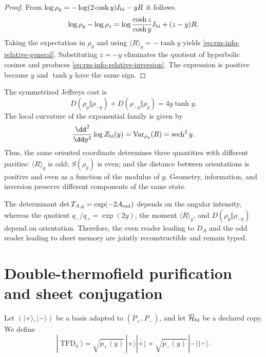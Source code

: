 \begin{proof}
From \(\log\rho_y=-\log(2\cosh y)I_{\rm bi}-yR\) it follows.
\[
 \log\rho_y-\log\rho_z
 =\log\frac{\cosh z}{\cosh y}I_{\rm bi}+(z-y)R.
\]
Taking the expectation in \(\rho_y\) and using
\(\langle R\rangle_y=-\tanh y\) yields
\cref{eq:rm-info-relative-general}. Substituting \(z=-y\) eliminates the quotient
of hyperbolic cosines and produces
\cref{eq:rm-info-relative-inversion}. The expression is positive because
\(y\) and \(\tanh y\) have the same sign.
\end{proof}

The symmetrized Jeffreys cost is
\begin{equation}
 D(\rho_y\Vert\rho_{-y})
 +D(\rho_{-y}\Vert\rho_y)
 =4y\tanh y.
 \label{eq:rm-info-jeffreys}
\end{equation}
The local curvature of the exponential family is given by
\begin{equation}
 \frac{\dd^2}{\dd y^2}\log Z_{\rm bi}(y)
 =\operatorname{Var}_{\rho_y}(R)
 =\operatorname{sech}^2y.
 \label{eq:rm-info-fisher}
\end{equation}
Thus, the same oriented coordinate determines three quantities with different
parities: \(\langle R\rangle_y\) is odd; \(S(\rho_y)\) is even; and the
distance between orientations is positive and even as a function of the modulus
of \(y\). Geometry, information, and inversion preserve
different components of the same state.

\begin{corollary}
The determinant
\(\det T_{A,y}=\exp(-2A_{\rm rad})\) depends on the angular intensity,
whereas the quotient \(q_-/q_+=\exp(2y)\), the moment
\(\langle R\rangle_y\), and
\(D(\rho_y\Vert\rho_{-y})\) depend on orientation. Therefore, the
even reader leading to \(D_A\) and the odd reader leading to sheet memory
are jointly reconstructible and remain typed.
\end{corollary}

\section{Double-thermofield purification and sheet conjugation}

Let \((|+\rangle,|-\rangle)\) be a basis adapted to
\((P_+,P_-)\), and let \(\overline{\mathcal H}_{\rm bi}\) be a declared
copy. We define
\begin{equation}
 |\operatorname{TFD}_y\rangle
 =\sqrt{p_+(y)}\,|+\rangle|\bar +\rangle
 +\sqrt{p_-(y)}\,|-\rangle|\bar -\rangle.
 \label{eq:rm-info-tfd-bicapa}
\end{equation}

